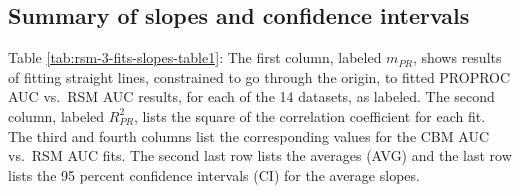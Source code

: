 \documentclass[
]{book}
\begin{document}
\hypertarget{rsm-3-fits-slopes-confidence-intervals-summary}{%
\subsection{Summary of slopes and confidence intervals}\label{rsm-3-fits-slopes-confidence-intervals-summary}}

\begin{table}[H]

\caption{\label{tab:rsm-3-fits-slopes-table1}Summary of slopes and correlations for the two constrained fits: PROPROC AUC vs. RSM AUC and CBM AUC vs. RSM AUC. The average of each slope equals unity to within 0.6 percent.}
\centering
{}
\end{table}

Table \ref{tab:rsm-3-fits-slopes-table1}: The first column, labeled \(m_{PR}\), shows results of fitting straight lines, constrained to go through the origin, to fitted PROPROC AUC vs.~RSM AUC results, for each of the 14 datasets, as labeled. The second column, labeled \(R^2_{PR}\), lists the square of the correlation coefficient for each fit. The third and fourth columns list the corresponding values for the CBM AUC vs.~RSM AUC fits. The second last row lists the averages (AVG) and the last row lists the 95 percent confidence intervals (CI) for the average slopes.
\end{document}
